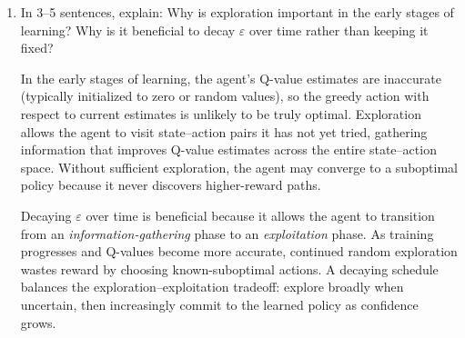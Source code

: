 \documentclass[12pt]{article}
\begin{document}
\begin{enumerate}[label=(\alph*)]
\item In 3--5 sentences, explain: Why is exploration important in the early stages of learning? Why is it beneficial to decay $\varepsilon$ over time rather than keeping it fixed?

\begin{stepbox}[Solution 6(c)]
In the early stages of learning, the agent's Q-value estimates are inaccurate (typically initialized to zero or random values), so the greedy action with respect to current estimates is unlikely to be truly optimal. Exploration allows the agent to visit state--action pairs it has not yet tried, gathering information that improves Q-value estimates across the entire state--action space. Without sufficient exploration, the agent may converge to a suboptimal policy because it never discovers higher-reward paths.

Decaying $\varepsilon$ over time is beneficial because it allows the agent to transition from an \emph{information-gathering} phase to an \emph{exploitation} phase. As training progresses and Q-values become more accurate, continued random exploration wastes reward by choosing known-suboptimal actions. A decaying schedule balances the exploration--exploitation tradeoff: explore broadly when uncertain, then increasingly commit to the learned policy as confidence grows.
\end{stepbox}

\end{enumerate}

\end{document}
